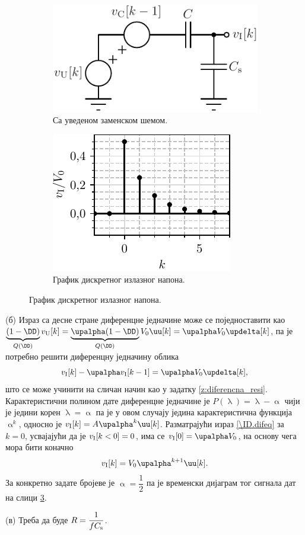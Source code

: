 \begin{figure}[ht!]
    \begin{subfigure}{0.49\textwidth}
        \centering
        \includegraphics[scale=0.833]{fig/sc-sol.pdf}
        \caption{Са уведеном заменском шемом.}
        \label{\ID.zam_sch}
    \end{subfigure}
    \begin{subfigure}{0.49\textwidth}
        \centering
        \includegraphics[scale=1]{fig/sc_plot.pdf}
        \caption{График дискретног излазног напона.}
        \label{\ID.fig.b}
    \end{subfigure}
\end{figure}

(б) Израз са десне стране диференцне једначине може се поједноставити као 
$\underbrace{(1 - \DD)}_{Q(\DD)} v_{\rm U}[k] = \underbrace{\upalpha(1 - \DD)}_{Q(\DD)} V_0 \uu[k] =\upalpha V_0 \updelta[k]$, па је потребно 
решити диференцну једначину облика
\begin{equation}
    v_{\rm I}[k] - \upalpha v_{\rm I}[k-1] = \upalpha V_0 \updelta[k], \label{\ID.difeq}
\end{equation}
што се може учинити на сличан начин као у задатку \ref{z:diferencna_resi}. Карактеристични полином дате диференцне једначине је 
$P(\uplambda) = \uplambda - \upalpha$ чији је једини корен $\uplambda = \upalpha$ па је у овом случају једина карактеристична 
функција $\upalpha^k$,  односно је $v_{\rm I}[k] = A \upalpha^k \uu[k]$. Разматрајући израз \eqref{\ID.difeq} за $k=0$, усвајајући
да је $v_{\rm I}[k < 0] = 0$, има се $v_{\rm I}[0] = \upalpha V_0$, на основу чега мора бити коначно
\begin{equation}
    v_{\rm I}[k] = V_0 \upalpha^{k+1} \uu[k]. 
\end{equation}
За конкретно задате бројеве је $\upalpha = \dfrac{1}{2}$ па је временски дијаграм тог сигнала дат на слици 
\ref{\ID.fig.b}.

(в) Треба да буде $R = \dfrac{1}{fC_{\rm s}}$.
